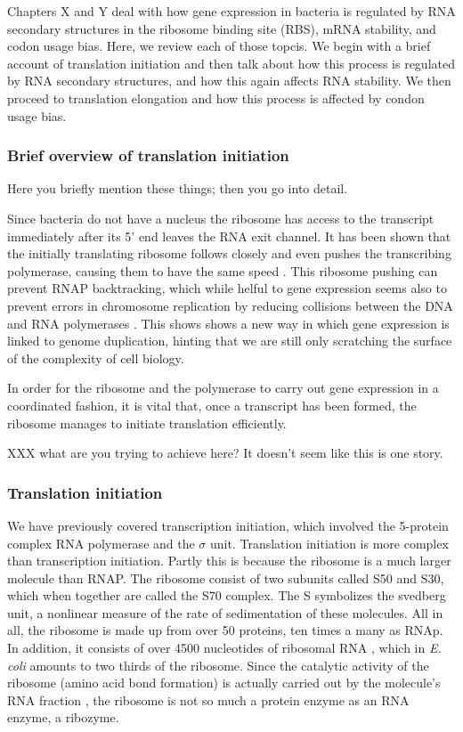 %
Chapters X and Y deal with how gene expression in bacteria is regulated by RNA
secondary structures in the ribosome binding site (RBS), mRNA stability, and
codon usage bias. Here, we review each of those topcis. We begin with a brief
account of translation initiation and then talk about how this process is
regulated by RNA secondary structures, and how this again affects RNA
stability. We then proceed to translation elongation and how this process is
affected by condon usage bias.

\subsubsection{Brief overview of translation initiation}

Here you briefly mention these things; then you go into detail.

Since bacteria do not have a nucleus the ribosome has access to the transcript
immediately after its 5' end leaves the RNA exit channel. It has been shown
that the initially translating ribosome follows closely and even pushes the
transcribing polymerase, causing them to have the same speed
\cite{proshkin_cooperation_2010}. This ribosome pushing can prevent RNAP
backtracking, which while helful to gene expression seems also to prevent
errors in chromosome replication by reducing collisions between the DNA and RNA
polymerases \cite{dutta_linking_2011}. This shows shows a new way in which gene
expression is linked to genome duplication, hinting that we are still only
scratching the surface of the complexity of cell biology.

In order for the ribosome and the polymerase to carry out gene expression in a
coordinated fashion, it is vital that, once a transcript has been formed, the
ribosome manages to initiate translation efficiently.

XXX what are you trying to achieve here? It doesn't seem like this is one
story.

\subsubsection{Translation initiation}

We have previously covered transcription initiation, which involved the
5-protein complex RNA polymerase and the $\sigma$ unit. Translation initiation
is more complex than transcription initiation. Partly this is because the
ribosome is a much larger molecule than RNAP. The ribosome consist of two
subunits called S50 and S30, which when together are called the S70 complex.
The S symbolizes the svedberg unit, a nonlinear measure of the rate of
sedimentation of these molecules. All in all, the ribosome is made up from over
50 proteins, ten times a many as RNAp. In addition, it consists of over 4500
nucleotides of ribosomal RNA \cite{laursen_initiation_2005}, which in
\textit{E. coli} amounts to two thirds of the ribosome. Since the catalytic
activity of the ribosome (amino acid bond formation) is actually carried out by
the molecule's RNA fraction \cite{steitz_rna_2003}, the ribosome is not so much
a protein enzyme as an RNA enzyme, a ribozyme.


